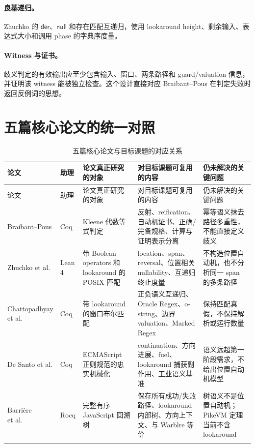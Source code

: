 \documentclass[UTF8,a4paper,12pt]{ctexart}
\begin{document}
\paragraph{良基递归。}
Zhuchko 的 $\mathsf{der}$、$\mathsf{null}$ 和存在匹配互递归，使用 lookaround height、剩余输入、表达式大小和调用 phase 的字典序度量。

\paragraph{Witness 与证书。}
歧义判定的有效输出应至少包含输入、窗口、两条路径和 guard/valuation 信息，并证明该 witness 能被独立检查。这个设计直接对应 Braibant--Pous 在判定失败时返回反例词的思想。


\section{五篇核心论文的统一对照}

\begin{longtable}{p{2.8cm}p{0.8cm}p{2.6cm}p{3.8cm}p{3.0cm}}
\toprule
论文 & 助理 & 论文真正研究的对象 & 对目标课题可复用的内容 & 仍未解决的关键问题 \\
\midrule
\endfirsthead
\toprule
论文 & 助理 & 论文真正研究的对象 & 对目标课题可复用的内容 & 仍未解决的关键问题 \\
\midrule
\endhead
Braibant--Pous & Coq & Kleene 代数等式判定 & 反射、reification、自动机证书、正确/完备规格、计算与证明表示分离 & 幂等语义抹去路径多重性，不能直接定义歧义 \\
Zhuchko et al. & Lean 4 & 带 Boolean operators 和 lookaround 的 POSIX 匹配 & location、span、reversal、位置相关 nullability、互递归终止度量 & 不构造位置自动机，也不分析同一 span 的多条路径 \\
\shortstack[l]{Chattopadhyay\\et al.} & Coq & 带 lookaround 的窗口布尔匹配 & 正负语义互递归、Oracle Regex、o-string、边界 valuation、Marked Regex & 保持匹配真假，不保持解析或运行数量 \\
De Santo et al. & Coq & ECMAScript 正则规范的忠实机械化 & continuation、方向进展、fuel、lookaround 捕获副作用、工业语义基准 & 语义远超第一阶段需求，不给出位置自动机模型 \\
\shortstack[l]{Barri\`ere\\et al.} & Rocq & 完整有序 JavaScript 回溯树 & 保存所有成功/失败路径、lookaround 内部树、方向上下文、与 Warblre 等价 & 树语义不是位置自动机；PikeVM 定理当前不含 lookaround \\
\bottomrule
\caption{五篇核心论文与目标课题的对应关系}
\end{longtable}
\end{document}
